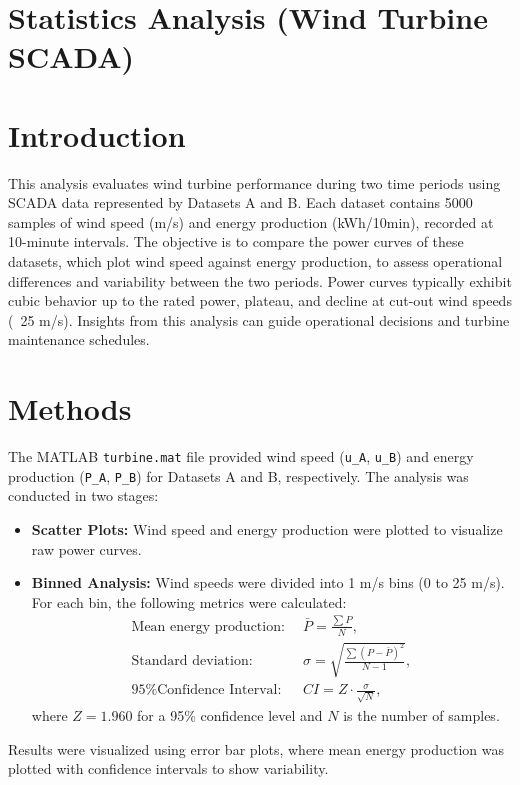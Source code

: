 \documentclass[a4paper,11pt]{article}
\begin{document}
\section{Statistics Analysis (Wind Turbine SCADA)}
\section*{Introduction}
This analysis evaluates wind turbine performance during two time periods using SCADA data represented by Datasets A and B. Each dataset contains 5000 samples of wind speed (m/s) and energy production (kWh/10min), recorded at 10-minute intervals. The objective is to compare the power curves of these datasets, which plot wind speed against energy production, to assess operational differences and variability between the two periods. Power curves typically exhibit cubic behavior up to the rated power, plateau, and decline at cut-out wind speeds (~25 m/s). Insights from this analysis can guide operational decisions and turbine maintenance schedules.

\section*{Methods}
The MATLAB \texttt{turbine.mat} file provided wind speed (\texttt{u\_A}, \texttt{u\_B}) and energy production (\texttt{P\_A}, \texttt{P\_B}) for Datasets A and B, respectively. The analysis was conducted in two stages:
\begin{itemize}
    \item \textbf{Scatter Plots:} Wind speed and energy production were plotted to visualize raw power curves.
    \item \textbf{Binned Analysis:} Wind speeds were divided into 1 m/s bins (0 to 25 m/s). For each bin, the following metrics were calculated:
    \begin{align}
        \text{Mean energy production: } & \, \bar{P} = \frac{\sum P}{N}, \\
        \text{Standard deviation: } & \, \sigma = \sqrt{\frac{\sum (P - \bar{P})^2}{N-1}}, \\
        \text{95\% Confidence Interval: } & \, CI = Z \cdot \frac{\sigma}{\sqrt{N}},
    \end{align}
    where $Z = 1.960$ for a 95\% confidence level and $N$ is the number of samples.
\end{itemize}

Results were visualized using error bar plots, where mean energy production was plotted with confidence intervals to show variability.
\end{document}

